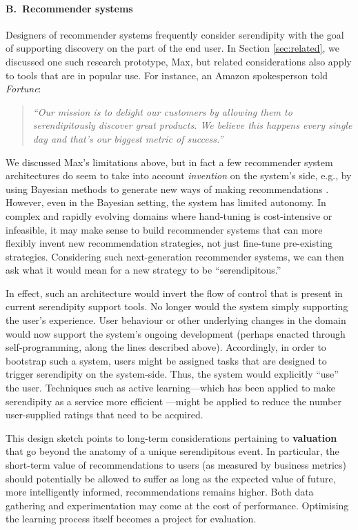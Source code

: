 \paragraph{B.~Recommender systems}
Designers of recommender systems frequently consider serendipity with
the goal of supporting discovery on the part of the end user.
In Section
\ref{sec:related},
we discussed
one such research prototype, {\sf Max}, but related
considerations also apply to tools that are in popular use.  For
instance, an Amazon spokesperson told \emph{Fortune}:
\begin{quote}
\emph{``Our mission is to delight our customers by allowing them to
serendipitously discover great products.  We believe this happens
every single day and that's our biggest metric of success.''}
\cite{amazon-secret}
\end{quote}
We discussed {\sf Max}'s
limitations above, but in fact a few recommender
system architectures do seem to take into account \emph{invention} on
the system's side, e.g., by using Bayesian methods to generate new
ways of making recommendations \cite{shengbo-guo-thesis}.  However,
even in the Bayesian setting, the system has limited autonomy.  In
complex and rapidly evolving domains where hand-tuning is
cost-intensive or infeasible, it may make sense to build recommender
systems that can more flexibly invent new recommendation
strategies, not just fine-tune pre-existing strategies.  Considering
such next-generation recommender systems, we can then ask what it
would mean for a new strategy to be ``serendipitous.''

In effect, such an architecture would invert the flow of control that
is present in current serendipity support tools.  No longer
would the system simply supporting the user's experience.
User behaviour or other underlying changes in the domain would
now support the system's
ongoing development (perhaps enacted through self-programming,
along the lines described above).  Accordingly, in order to bootstrap such a system,
users might be assigned tasks that are designed to trigger serendipity
on the system-side.  Thus, the system would explicitly ``use'' the
user.  Techniques such as active learning---which has been applied to
make serendipity as a service more efficient
\cite{10.1007/978-3-319-58068-5_8}---might be applied to reduce the number
user-supplied ratings that need to be acquired.

This design sketch points to long-term considerations pertaining to
\textbf{valuation} that go beyond the anatomy of a unique
serendipitous event.  In particular, the short-term value of
recommendations to users (as measured by business metrics) should
potentially be allowed to suffer as long as the expected value of
future, more intelligently informed, recommendations remains higher.
Both data gathering and experimentation may come at the cost of
performance.  Optimising the learning process itself becomes a project
for evaluation.

